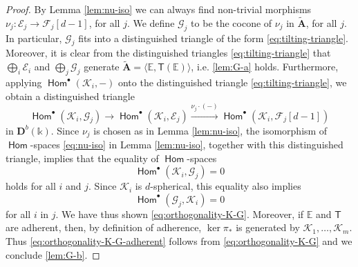 \documentclass[a4paper,11pt, reqno]{amsart}
\def\E{\mathbb E}
\def\AA{\mathbf A}
\def\DD{\mathbf D}
\def\sE{\mathscr{E}}
\def\sF{\mathscr{F}}
\def\sG{\mathscr{G}}
\def\sK{\mathscr{K}}
\newcommand{\opname}[1]{\operatorname{\mathsf{#1}}}
\newcommand{\Hom}{\opname{Hom}}
\def\Db{\DD^b}
\newcommand{\bT}{\mathsf{T}}
\theoremstyle{plain}
\theoremstyle{definition}
\numberwithin{equation}{section}
\newlength{\arrow}
\begin{document}
\begin{proof}
By Lemma \ref{lem:nu-iso} we can always find non-trivial morphisms $\nu_j \colon \sE_j \to \sF_j [d-1]$, for all $j$.    
We define $\sG_j$ to be the cocone of $\nu_j $ in $\tilde{\AA}$, for all $j$.
In particular, $\sG_j$ fits into a distinguished triangle of the form \eqref{eq:tilting-triangle}.
Moreover, it is clear from the distinguished triangles \eqref{eq:tilting-triangle} that $\bigoplus_i \sE_i$ and $\bigoplus_j \sG_j$ generate $\tilde{\AA} = \langle \E , \bT ( \E ) \rangle$, i.e. \eqref{lem:G-a} holds.
Furthermore, applying $\Hom^\bullet ( \sK_i , - )$ onto the distinguished triangle \eqref{eq:tilting-triangle}, we obtain a distinguished triangle
\[
\Hom^\bullet ( \sK_i , \sG_j  ) \to \Hom^\bullet ( \sK_i , \sE_j  ) \xrightarrow{\nu_j \cdot (-)} \Hom^\bullet ( \sK_i , \sF_j [d-1]  ) 
\]
in $\Db(\mathbb{k})$.
Since $\nu_j$ is chosen as in Lemma \ref{lem:nu-iso}, the isomorphism of $\Hom$-spaces \eqref{eq:nu-iso} in Lemma \ref{lem:nu-iso}, together with this distinguished triangle, implies that the equality of $\Hom$-spaces
\[
\Hom^\bullet ( \sK_i , \sG_j ) = 0
\]
holds for all $i$ and $j$.
Since $\sK_i$ is $d$-spherical, this equality  also implies
\[
\Hom^\bullet ( \sG_j , \sK_i ) = 0
\]
for all $i$ in $j$.
We have thus shown \eqref{eq:orthogonality-K-G}.
Moreover, if $\E$ and $\bT$ are adherent, then, by definition of adherence, $\ker \pi_\ast$ is generated by $\sK_1 , \ldots , \sK_m$.
Thus \eqref{eq:orthogonality-K-G-adherent} follows from \eqref{eq:orthogonality-K-G} and we conclude \eqref{lem:G-b}.


\end{proof}
\end{document}
